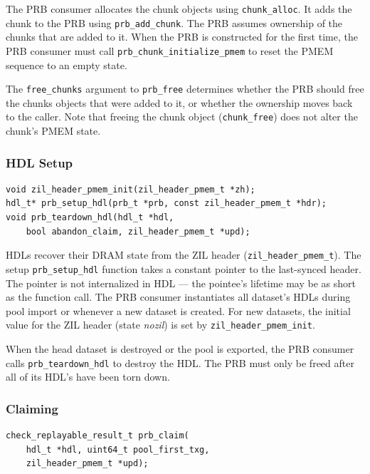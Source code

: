 \documentclass[12pt,a4paper,twoside]{book}
\begin{document}
The PRB consumer allocates the chunk objects using \lstinline{chunk_alloc}.
It adds the chunk to the PRB using \lstinline{prb_add_chunk}.
The PRB assumes ownership of the chunks that are added to it.
When the PRB is constructed for the first time, the PRB consumer must call \lstinline{prb_chunk_initialize_pmem} to reset the PMEM sequence to an empty state.

The \lstinline{free_chunks} argument to \lstinline{prb_free} determines whether the PRB should free the chunks objects that were added to it, or whether the ownership moves back to the caller.
Note that freeing the chunk object (\lstinline{chunk_free}) does not alter the chunk's PMEM state.

\subsubsection{HDL Setup}\label{di:prb:api:hdl}
\begin{lstlisting}
void zil_header_pmem_init(zil_header_pmem_t *zh);
hdl_t* prb_setup_hdl(prb_t *prb, const zil_header_pmem_t *hdr);
void prb_teardown_hdl(hdl_t *hdl,
    bool abandon_claim, zil_header_pmem_t *upd);
\end{lstlisting}

HDLs recover their DRAM state from the ZIL header (\lstinline{zil_header_pmem_t}).
The setup \lstinline{prb_setup_hdl} function takes a constant pointer to the last-synced header.
The pointer is not internalized in HDL --- the pointee's lifetime may be as short as the function call.
The PRB consumer instantiates all dataset's HDLs during pool import or whenever a new dataset is created.
For new datasets, the initial value for the ZIL header (state \textit{nozil}) is set by \lstinline{zil_header_pmem_init}.

When the head dataset is destroyed or the pool is exported, the PRB consumer calls \lstinline{prb_teardown_hdl} to destroy the HDL.
The PRB must only be freed after all of its HDL's have been torn down.

\subsubsection{Claiming}\label{di:prb:api:claiming}

\begin{lstlisting}
check_replayable_result_t prb_claim(
    hdl_t *hdl, uint64_t pool_first_txg,
    zil_header_pmem_t *upd);
\end{lstlisting}
\end{document}
